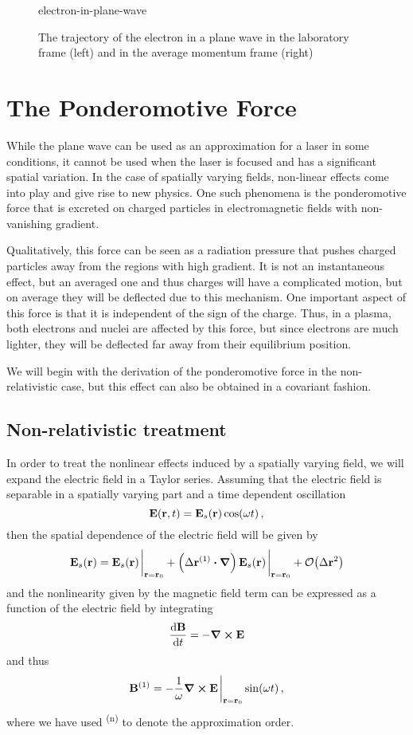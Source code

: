 \documentclass[12pt, class=report, crop=false]{standalone}
\begin{document}
\begin{figure}[h]
  \centering
  {electron-in-plane-wave}%
  \caption{The trajectory of the electron in a plane wave in the laboratory frame
  (left) and in the average momentum frame (right)}\label{fig:electron-in-plane-wave}%
\end{figure}

\section{The Ponderomotive Force}

While the plane wave can be used as an approximation for a laser in some conditions,
it cannot be used when the laser is focused and has a significant spatial variation.
In the case of spatially varying fields, non-linear effects come into play and
give rise to new physics. One such phenomena is the ponderomotive force that
is excreted on charged particles in electromagnetic fields with non-vanishing
gradient.

Qualitatively, this force can be seen as a radiation pressure that
pushes charged particles away from the regions with high gradient. It is not
an instantaneous effect, but an averaged one and thus charges will have a
complicated motion, but on average they will be deflected due to this mechanism.
One important aspect of this force is that it is independent of the sign of the charge.
Thus, in a plasma, both electrons and nuclei are affected by this force, but
since electrons are much lighter, they will be deflected far away from their
equilibrium position.

We will begin with the derivation of the ponderomotive force in the non-relativistic
case, but this effect can also be obtained in a covariant fashion.

\subsection{Non-relativistic treatment}

In order to treat the nonlinear effects induced by a spatially varying field,
we will expand the electric field in a Taylor series.
Assuming that the electric field is separable in a spatially varying part and
a time dependent oscillation
\[
\vb{E}(\vb{r},t) = \vb{E}_s(\vb{r})\cos(\omega t)\,,
\]
then the spatial dependence of the electric field will be given by
\[
\vb{E}_s(\vb{r}) = \vb{E}_s(\vb{r})\eval_{\vb{r}=\vb{r}_0} +
\left(\Delta \vb{r}^{(1)}\vdot\vb*{\nabla}\right)\vb{E}_s(\vb{r})\eval_{\vb{r}=\vb{r}_0} + \order{\Delta\vb{r}^2}
\]
and the nonlinearity given by the magnetic field term can be expressed as a
function of the electric field by integrating
\[
\dv{\vb{B}}{t} = -\curl{\vb{E}}
\]
and thus
\[
\vb{B}^{(1)} = -\frac{1}{\omega}\curl{\vb{E}}\eval_{\vb{r}=\vb{r}_0} \sin(\omega t)\,,
\]
where we have used \textsuperscript{(n)} to denote the approximation order.
\end{document}
